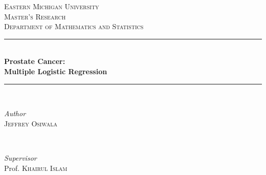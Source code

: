 \documentclass[11pt, a4paper]{article}
\begin{document}

\begin{titlepage} %
	\newcommand{\HRule}{\rule{\linewidth}{0.5mm}} %
	\center %
	
	\textsc{\LARGE Eastern Michigan University}\\[1.5cm] %
	\textsc{\Large Master's Research}\\[0.5cm] %
	\textsc{\large Department of Mathematics and Statistics}\\[0.5cm] %

	
	\HRule\\[0.4cm]
	{\huge\bfseries Prostate Cancer: \\ [0.5cm] Multiple Logistic Regression}\\[0.4cm] %
	\HRule\\[1.5cm]
	
	
	\begin{minipage}{0.4\textwidth}
		\begin{flushleft}
			\large
			\textit{Author}\\
			\textsc{Jeffrey Osiwala} %
		\end{flushleft}
	\end{minipage}
	~
	\begin{minipage}{0.4\textwidth}
		\begin{flushright}
			\large
			\textit{Supervisor}\\
			Prof. \textsc{Khairul Islam} %
		\end{flushright}
	\end{minipage}
	
	

\end{titlepage}
\end{document}
